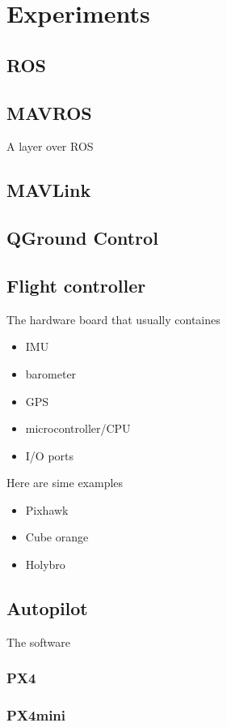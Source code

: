 \chapter{Experiments}
\section{ROS}

\section{MAVROS}
A layer over ROS

\section{MAVLink}

\section{QGround Control}

\section{Flight controller}
The hardware board that usually containes
    \begin{itemize}
        \item IMU
        \item barometer
        \item GPS
        \item microcontroller/CPU
        \item I/O ports
    \end{itemize}

    Here are sime examples
    \begin{itemize}
        \item Pixhawk
        \item Cube orange
        \item Holybro
    \end{itemize}

\section{Autopilot}
The software
    \subsection{PX4}
    \subsection{PX4mini}

